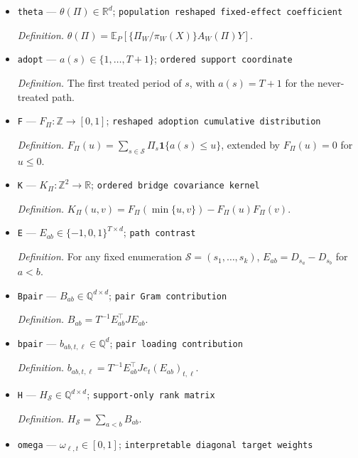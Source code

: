 \documentclass{article}
\begin{document}
\begin{itemize}
  \par\smallskip\noindent\emph{Definition.} \(A_s(\Pi)=T^{-1}G(\Pi)^{-1}R_s(\Pi)^{\top}\).
  \item \texttt{theta} --- \(\theta(\Pi)\in\mathbb R^{d}\); \texttt{population reshaped fixed-\allowbreak{}effect coefficient}
  \par\smallskip\noindent\emph{Definition.} \(\theta(\Pi)=\mathbb E_P[\{\Pi_W/\pi_W(X)\}A_W(\Pi)Y]\).
  \item \texttt{adopt} --- \(a(s)\in\{1,\ldots,T+1\}\); \texttt{ordered support coordinate}
  \par\smallskip\noindent\emph{Definition.} The first treated period of \(s\), with \(a(s)=T+1\) for the never-treated path.
  \item \texttt{F} --- \(F_{\Pi}:\mathbb Z\to[0,1]\); \texttt{reshaped adoption cumulative distribution}
  \par\smallskip\noindent\emph{Definition.} \(F_{\Pi}(u)=\sum_{s\in\mathcal S}\Pi_s\mathbf 1\{a(s)\le u\}\), extended by \(F_{\Pi}(u)=0\) for \(u\le0\).
  \item \texttt{K} --- \(K_{\Pi}:\mathbb Z^2\to\mathbb R\); \texttt{ordered bridge covariance kernel}
  \par\smallskip\noindent\emph{Definition.} \(K_{\Pi}(u,v)=F_{\Pi}(\min\{u,v\})-F_{\Pi}(u)F_{\Pi}(v)\).
  \item \texttt{E} --- \(E_{ab}\in\{-1,0,1\}^{T\times d}\); \texttt{path contrast}
  \par\smallskip\noindent\emph{Definition.} For any fixed enumeration \(\mathcal S=(s_1,\ldots,s_k)\), \(E_{ab}=D_{s_a}-D_{s_b}\) for \(a<b\).
  \item \texttt{Bpair} --- \(B_{ab}\in\mathbb Q^{d\times d}\); \texttt{pair Gram contribution}
  \par\smallskip\noindent\emph{Definition.} \(B_{ab}=T^{-1}E_{ab}^{\top}JE_{ab}\).
  \item \texttt{bpair} --- \(b_{ab,t,\ell}\in\mathbb Q^{d}\); \texttt{pair loading contribution}
  \par\smallskip\noindent\emph{Definition.} \(b_{ab,t,\ell}=T^{-1}E_{ab}^{\top}Je_t(E_{ab})_{t,\ell}\).
  \item \texttt{H} --- \(H_{\mathcal S}\in\mathbb Q^{d\times d}\); \texttt{support-\allowbreak{}only rank matrix}
  \par\smallskip\noindent\emph{Definition.} \(H_{\mathcal S}=\sum_{a<b}B_{ab}\).
  \item \texttt{omega} --- \(\omega_{\ell,t}\in[0,1]\); \texttt{interpretable diagonal target weights}

\end{itemize}
\end{document}
